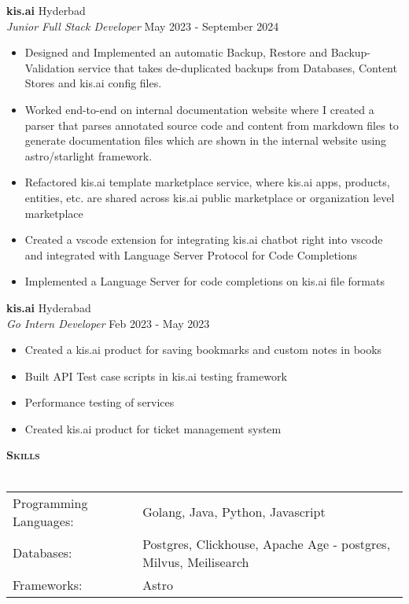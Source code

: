 \documentclass[a4paper]{article}
\newcommand{\lineunder} {
    \vspace*{-8pt} \\
    \hspace*{-18pt} \hrulefill \\
}
\newcommand{\header} [1] {
    {\hspace*{-18pt}\vspace*{6pt} \textbf{\textsc{#1}}}
    \vspace*{-6pt} \lineunder
}
\begin{document}
\textbf{kis.ai} \hfill Hyderbad\\
\textit{Junior Full Stack Developer} \hfill May 2023 - September 2024\\
\vspace{-1mm}
\begin{itemize} \itemsep 1pt
	\item Designed and Implemented an automatic Backup, Restore and Backup-Validation service that takes de-duplicated backups from Databases, Content Stores and kis.ai config files.
	\item Worked end-to-end on internal documentation website where I created a parser that parses annotated source code and content from markdown files to generate documentation files which are shown in the internal website using astro/starlight framework.
	\item Refactored kis.ai template marketplace service, where kis.ai apps, products, entities, etc. are shared across kis.ai public marketplace or organization level marketplace
	\item Created a vscode extension for integrating kis.ai chatbot right into vscode and integrated with Language Server Protocol for Code Completions
	\item Implemented a Language Server for code completions on kis.ai file formats
\end{itemize}
\textbf{kis.ai} \hfill Hyderabad\\
\textit{Go Intern Developer} \hfill Feb 2023 - May 2023\\
\vspace{-1mm}
\begin{itemize} \itemsep 1pt
	\item Created a kis.ai product for saving bookmarks and custom notes in books
	\item Built API Test case scripts in kis.ai testing framework
	\item Performance testing of services
	\item Created kis.ai product for ticket management system
\end{itemize}

\header{Skills}
\begin{tabular}{ l l }
	Programming Languages: & Golang, Java, Python, Javascript                                 \\
	Databases:             & Postgres, Clickhouse, Apache Age - postgres, Milvus, Meilisearch \\
	Frameworks:            & Astro                                                            \\
\end{tabular}
\vspace{2mm}
\end{document}

